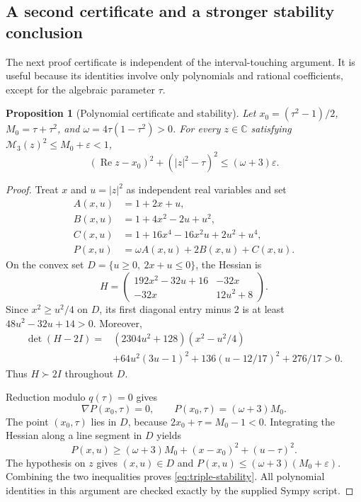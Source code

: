 \documentclass[11pt,a4paper]{article}
\newtheorem{proposition}[theorem]{Proposition}
\theoremstyle{definition}\newtheorem{definition}[theorem]{Definition}
\theoremstyle{remark}\newtheorem{remark}[theorem]{Remark}
\newcommand{\C}{\mathbb C}\newcommand{\R}{\mathbb R}
\newcommand{\Rea}{\operatorname{Re}}
\newcommand{\M}{\mathcal M}
\begin{document}
\subsection{A second certificate and a stronger stability conclusion}
The next proof certificate is independent of the interval-touching argument. It is useful because its identities involve only polynomials and rational coefficients, except for the algebraic parameter $\tau$.

\begin{proposition}[Polynomial certificate and stability]\label{prop:triple-stability}
Let $x_0=(\tau^2-1)/2$, $M_0=\tau+\tau^2$, and
$\omega=4\tau(1-\tau^2)>0$. For every $z\in\C$ satisfying
$\M_3(z)^2\le M_0+\varepsilon<1$,
\begin{equation}\label{eq:triple-stability}
\boxed{\ (\Rea z-x_0)^2+(|z|^2-\tau)^2
\le(\omega+3)\varepsilon.\ }
\end{equation}
\end{proposition}
\begin{proof}
Treat $x$ and $u=|z|^2$ as independent real variables and set
\begin{align*}
A(x,u)&=1+2x+u,\\
B(x,u)&=1+4x^2-2u+u^2,\\
C(x,u)&=1+16x^4-16x^2u+2u^2+u^4,\\
P(x,u)&=\omega A(x,u)+2B(x,u)+C(x,u).
\end{align*}
On the convex set $D=\{u\ge0,\ 2x+u\le0\}$, the Hessian is
\[
H=\begin{pmatrix}
192x^2-32u+16&-32x\\-32x&12u^2+8
\end{pmatrix}.
\]
Since $x^2\ge u^2/4$ on $D$, its first diagonal entry minus $2$ is at least
$48u^2-32u+14>0$. Moreover,
\begin{align}\label{eq:hessian-sos}
\det(H-2I)
={}&(2304u^2+128)(x^2-u^2/4)\\
&+64u^2(3u-1)^2+136(u-12/17)^2+276/17>0.\nonumber
\end{align}
Thus $H\succ2I$ throughout $D$.

Reduction modulo $q(\tau)=0$ gives
\[
\nabla P(x_0,\tau)=0,\qquad
P(x_0,\tau)=(\omega+3)M_0.
\]
The point $(x_0,\tau)$ lies in $D$, because $2x_0+\tau=M_0-1<0$. Integrating the Hessian along a line segment in $D$ yields
\[
P(x,u)\ge(\omega+3)M_0+(x-x_0)^2+(u-\tau)^2.
\]
The hypothesis on $z$ gives $(x,u)\in D$ and
$P(x,u)\le(\omega+3)(M_0+\varepsilon)$. Combining the two inequalities proves \eqref{eq:triple-stability}. All polynomial identities in this argument are checked exactly by the supplied Sympy script.
\end{proof}
\end{document}
